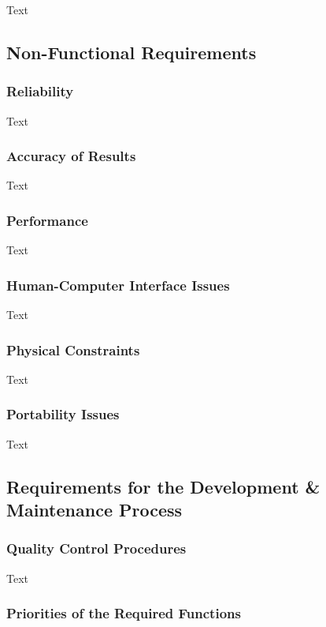 \documentclass[12pt]{article}
\begin{document}
Text

\subsection{Non-Functional Requirements}

\subsubsection {Reliability}

Text

\subsubsection {Accuracy of Results}

Text

\subsubsection {Performance}

Text

\subsubsection {Human-Computer Interface Issues}

Text

\subsubsection {Physical Constraints}

Text

\subsubsection {Portability Issues}

Text

\subsection{Requirements for the Development \& Maintenance Process}

\subsubsection {Quality Control Procedures}

Text

\subsubsection {Priorities of the Required Functions}
\end{document}
